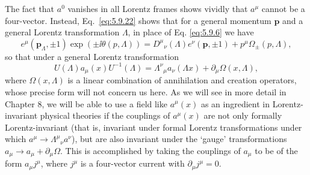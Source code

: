 The fact that $a^0$ vanishes in all Lorentz frames shows vividly that $a^\mu$
cannot be a four-vector. Instead, Eq.~\eqref{eq:5.9.22} shows that for a general momentum
$\mathbf p$ and a general Lorentz transformation $\Lambda$, in place of Eq.
\eqref{eq:5.9.6} we have
\begin{equation}
e^\mu(\mathbf p_\Lambda,\pm1)\exp(\pm \ii\theta(p,\Lambda))
=D^\mu{}_\nu(\Lambda)e^\nu(\mathbf p,\pm1)
+p^\mu\Omega_\pm(p,\Lambda),
\tag{5.9.30}\label{eq:5.9.30}
\end{equation}
so that under a general Lorentz transformation
\begin{equation}
U(\Lambda)a_\mu(x)U^{-1}(\Lambda)=
\Lambda^\nu{}_\mu a_\nu(\Lambda x)+\partial_\mu\Omega(x,\Lambda),
\tag{5.9.31}\label{eq:5.9.31}
\end{equation}
where $\Omega(x,\Lambda)$ is a linear combination of annihilation and creation
operators, whose precise form will not concern us here. As we will see in more
detail in Chapter 8, we will be able to use a field like $a^\mu(x)$ as an
ingredient in Lorentz-invariant physical theories if the couplings of
$a^\mu(x)$ are not only formally Lorentz-invariant (that is, invariant under
formal Lorentz transformations under which $a^\mu\to\Lambda^\mu{}_\nu
a^\nu$), but are also invariant under the `gauge' transformations
$a_\mu\to a_\mu+\partial_\mu\Omega$. This is accomplished by taking the
couplings of $a_\mu$ to be of the form $a_\mu j^\mu$, where $j^\mu$ is a
four-vector current with $\partial_\mu j^\mu=0$.

